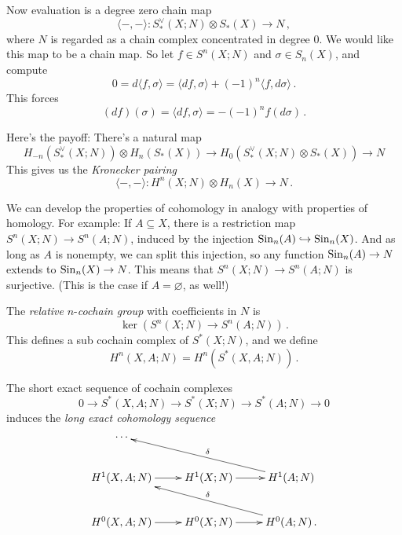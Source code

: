 Now evaluation is a degree zero chain map
\[
\langle-,-\rangle:S^\vee_\ast(X;N)\otimes S_\ast(X)\to N\,,
\]
where $N$ is regarded as a chain complex concentrated in degree 0.
We would like this map to be a chain map. So let $f\in S^n(X;N)$ and 
$\sigma\in S_n(X)$, and compute
\[
0 = d\langle f,\sigma\rangle=
\langle df,\sigma\rangle+(-1)^n\langle f,d\sigma\rangle\,.
\]
This forces 
\[
(df)(\sigma)=\langle df,\sigma\rangle=-(-1)^nf(d\sigma)\,.
\]

Here's the payoff: There's a natural map 
\[
H_{-n}(S^\vee_\ast(X;N))\otimes H_n(S_\ast(X))\to 
H_0\left(S^\vee_\ast(X;N)\otimes S_\ast(X)\right)\to N
\]
This gives us the {\em Kronecker pairing}
\[
\langle-,-\rangle:H^n(X;N)\otimes H_n(X)\to N\,.
\]

We can develop the properties of cohomology in analogy with properties
of homology. For example:
If $A\subseteq X$, there is a restriction map $S^n(X;N)\to S^n(A;N)$, induced by the injection $\mathrm{Sin}_n(A)\hookrightarrow \mathrm{Sin}_n(X)$. 
And as long as $A$ is nonempty, we can split this injection, so any function $\mathrm{Sin}_n(A)\to N$ extends to $\mathrm{Sin}_n(X)\to N$. This means that $S^n(X;N)\to S^n(A;N)$ is surjective. (This is the case if $A=\varnothing$, as well!) 
\begin{definition} The {\em relative} $n$-{\em cochain group} with coefficients in $N$ is
\[
\ker\left(S^n(X;N)\to S^n(A;N)\right)\,.
\]
This defines a sub cochain complex of $S^\ast(X;N)$, and we define
\[
H^n(X,A;N)=H^n(S^\ast(X,A;N))\,.
\]
\end{definition}

The short exact sequence of cochain complexes
\[
0\to S^\ast(X,A;N)\to S^\ast(X;N)\to S^\ast(A;N)\to0
\]
induces the {\em long exact cohomology sequence}
\begin{equation*}
\xymatrix{
	\cdots & & \\
	 H^1(X,A;N)\ar[r] & H^1(X;N)\ar[r] & H^1(A;N)\ar[ull]_{\delta}\\
	 H^0(X,A;N)\ar[r] & H^0(X;N)\ar[r] & H^0(A;N)\ar[ull]_{\delta}\,.
}
\end{equation*}


